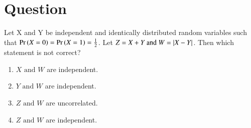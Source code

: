 \documentclass[journal,12pt,twocolumn]{IEEEtran}
\theoremstyle{definition}
\begin{document}
\section*{Question}
 Let X and Y be independent and identically distributed random variables such that \(\Pr\left(X=0\right)=\Pr\left(X=1\right)= \frac{1}{2}\). Let \(Z = X+Y \text{ and } W = \vert X-Y\vert\). Then which statement is not correct?
 \begin{enumerate}[label=\Alph*)]
     \item $X \text{ and } W$ are independent.
     \item $Y \text{ and } W$ are independent.
     \item $Z \text{ and } W$ are uncorrelated.
     \item $Z \text{ and } W$ are independent.
 \end{enumerate}
\end{document}
